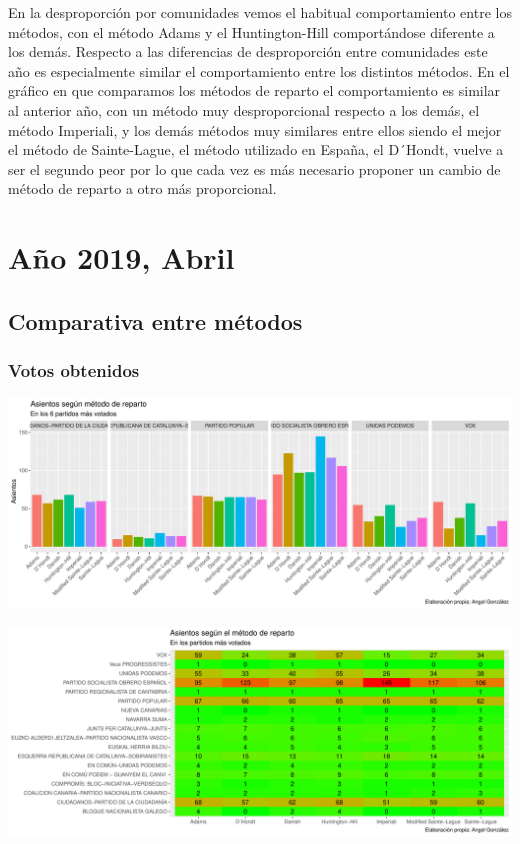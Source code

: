 \documentclass[12pt,a4paper,]{book}
\numberwithin{dummy}{section}
\theoremstyle{ocrenumbox}
\theoremstyle{blacknumex}
\theoremstyle{blacknumbox}
\theoremstyle{ocrenum}
\theoremstyle{ocrenum}
\begin{document}
En la desproporción por comunidades vemos el habitual comportamiento
entre los métodos, con el método Adams y el Huntington-Hill
comportándose diferente a los demás. Respecto a las diferencias de
desproporción entre comunidades este año es especialmente similar el
comportamiento entre los distintos métodos. En el gráfico en que
comparamos los métodos de reparto el comportamiento es similar al
anterior año, con un método muy desproporcional respecto a los demás, el
método Imperiali, y los demás métodos muy similares entre ellos siendo
el mejor el método de Sainte-Lague, el método utilizado en España, el
D´Hondt, vuelve a ser el segundo peor por lo que cada vez es más
necesario proponer un cambio de método de reparto a otro más
proporcional.

\hypertarget{auxf1o-2019-abril}{%
\section{Año 2019, Abril}\label{auxf1o-2019-abril}}

\hypertarget{comparativa-entre-muxe9todos-13}{%
\subsection{Comparativa entre
métodos}\label{comparativa-entre-muxe9todos-13}}

\hypertarget{votos-obtenidos-13}{%
\subsubsection{Votos obtenidos}\label{votos-obtenidos-13}}

\begin{center}\includegraphics[width=0.95\linewidth]{figurasR/unnamed-chunk-176-1} \end{center}

\begin{center}\includegraphics[width=0.95\linewidth]{figurasR/unnamed-chunk-176-2} \end{center}
\end{document}

